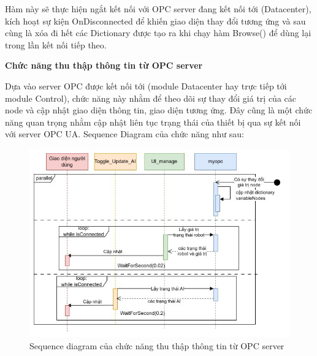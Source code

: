 Hàm này sẽ thực hiện ngắt kết nối với OPC server đang kết nối tới (Datacenter), kích hoạt sự kiện OnDisconnected để khiến giao diện thay đổi tương ứng và sau cùng là xóa đi hết các Dictionary được tạo ra khi chạy hàm Browse() để dùng lại trong lần kết nối tiếp theo.

\textbf{Chức năng thu thập thông tin từ OPC server} 

Dựa vào server OPC được kết nối tới (module Datacenter hay trực tiếp tới module Control), chức năng này nhằm để theo dõi sự thay đổi giá trị của các node và cập nhật giao diện thông tin, giao diện tương ứng. Đây cũng là một chức năng quan trọng nhằm cập nhật liên tục trạng thái của thiết bị qua sự kết nối với server OPC UA. Sequence Diagram của chức năng như sau:

\begin{figure}[H]
    \centering
    \includegraphics[width=1\textwidth]{Images/Implementation/VRapp/VR_update.jpg}
    \caption{Sequence diagram của chức năng thu thập thông tin từ OPC server}
    \label{fig:seq_collectInfo}
\end{figure}

